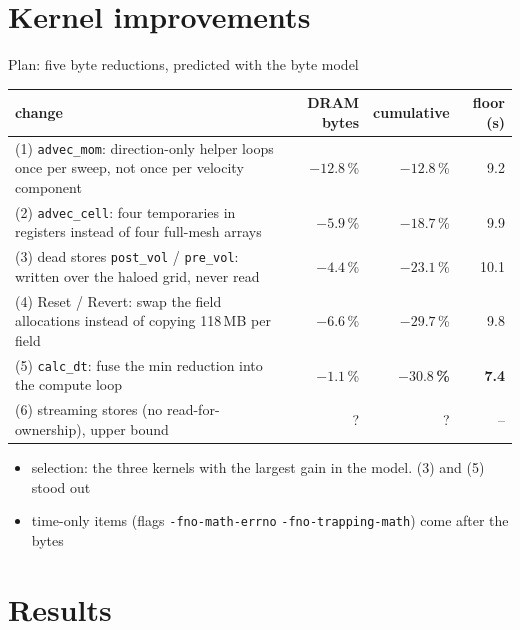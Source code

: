 \documentclass[aspectratio=169,10pt]{beamer}
\newcommand{\kernel}[1]{\texttt{#1}}
\newcommand{\good}[1]{\textcolor{rugred}{\textbf{#1}}}
\begin{document}
\section{Kernel improvements}

\begin{frame}{Plan: five byte reductions, predicted with the byte model}
  \footnotesize
  \begin{tabular}{p{8.2cm}rrr}
    \toprule
    change & DRAM bytes & cumulative & floor (s) \\
    \midrule
    (1) \kernel{advec\_mom}: direction-only helper loops once per sweep, not once per velocity component & $-12.8$\,\% & $-12.8$\,\% & 9.2 \\
    (2) \kernel{advec\_cell}: four temporaries in registers instead of four full-mesh arrays & $-5.9$\,\% & $-18.7$\,\% & 9.9 \\
    (3) dead stores \texttt{post\_vol} / \texttt{pre\_vol}: written over the haloed grid, never read & $-4.4$\,\% & $-23.1$\,\% & 10.1 \\
    (4) Reset / Revert: swap the field allocations instead of copying 118\,MB per field & $-6.6$\,\% & $-29.7$\,\% & 9.8 \\
    (5) \kernel{calc\_dt}: fuse the min reduction into the compute loop & $-1.1$\,\% & \good{$-30.8$\,\%} & \good{7.4} \\
    \midrule
    (6) streaming stores (no read-for-ownership), upper bound & ? & ? & -- \\
    \bottomrule
  \end{tabular}
  \vspace{0.15cm}
  \normalsize
  \begin{itemize}
    \item selection: the three kernels with the largest gain in the model. (3) and (5) stood out
    \item time-only items (flags \texttt{-fno-math-errno} \texttt{-fno-trapping-math}) come after the bytes
  \end{itemize}
\end{frame}



\section{Results}
\end{document}

